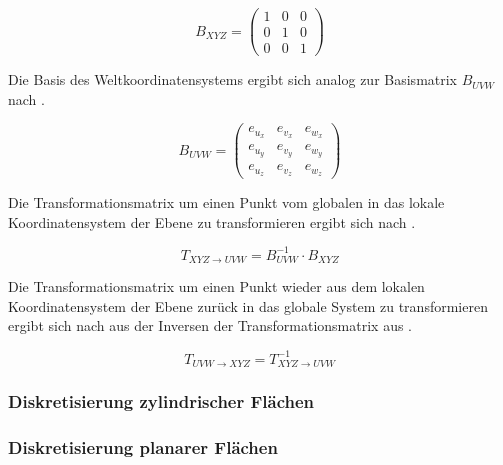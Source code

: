 \begin{singlespace}
	\begin{equation}\label{eq:basematrixxyz}
		B_{XYZ} = \begin{pmatrix}
		1 & 0 & 0 \\ 
		0 & 1 & 0 \\ 
		0 & 0 & 1
		\end{pmatrix} 
	\end{equation} 
\end{singlespace}

Die Basis des Weltkoordinatensystems ergibt sich analog zur Basismatrix $B_{UVW}$ nach .

\begin{singlespace}
	\begin{equation}\label{eq:basematrixuvw}
	B_{UVW} = \begin{pmatrix}
	e_{u_x} & e_{v_x} & e_{w_x} \\ 
	e_{u_y} & e_{v_y} & e_{w_y} \\ 
	e_{u_z} & e_{v_z} & e_{w_z}
	\end{pmatrix} 
	\end{equation} 
\end{singlespace}

Die Transformationsmatrix um einen Punkt vom globalen in das lokale Koordinatensystem der Ebene zu transformieren ergibt sich nach .

\begin{equation}\label{eq:trafoXYZ2UVW}
T_{XYZ \rightarrow UVW} = B_{UVW}^{-1} \cdot B_{XYZ}  
\end{equation}   

Die Transformationsmatrix um einen Punkt wieder aus dem lokalen Koordinatensystem der Ebene zurück in das globale System zu transformieren ergibt sich nach  aus der Inversen der Transformationsmatrix aus .

\begin{equation}\label{eq:trafoUVW2XYZ}
T_{UVW \rightarrow XYZ} = T_{XYZ \rightarrow UVW}^{-1} 
\end{equation}   



\subsubsection{Diskretisierung zylindrischer Flächen}

\subsubsection{Diskretisierung planarer Flächen}

